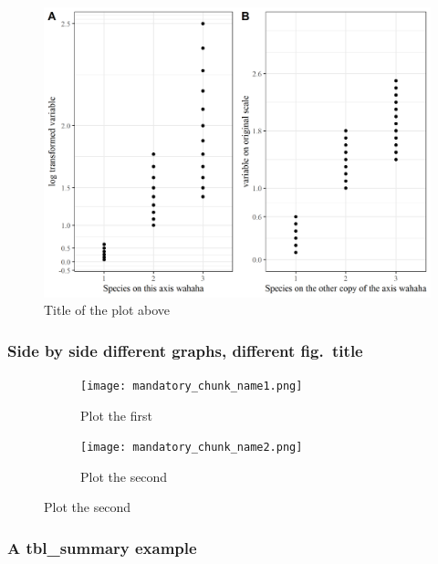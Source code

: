 \documentclass[
]{article}
\begin{document}
\begin{figure}[H]

{\centering \includegraphics[width=0.9\linewidth]{cookbook_files/figure-latex/two_log_norm_plot-1} 

}

\caption{Title of the plot above}\label{fig:two_log_norm_plot}
\end{figure}

\newpage

\hypertarget{side-by-side-different-graphs-different-fig.-title}{%
\subsubsection{Side by side different graphs, different
fig.~title}\label{side-by-side-different-graphs-different-fig.-title}}

\begin{figure}[h]
\begin{multicols}{2}
\begin{figure}[H]
\texttt{[image: mandatory\_chunk\_name1.png]}
\caption{Plot the first}
\label{fig:plotmeans}
\end{figure}

\columnbreak

\begin{figure}[H]
\texttt{[image: mandatory\_chunk\_name2.png]}
\centering
\caption{Plot the second}
\label{fig:histogram}
\end{figure}
\end{multicols}
\end{figure}

\newpage

\hypertarget{a-tbl_summary-example}{%
\subsubsection{A tbl\_summary example}\label{a-tbl_summary-example}}
\end{document}
